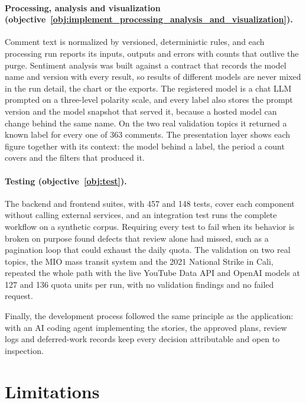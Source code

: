 \paragraph{Processing, analysis and visualization (objective~\ref{obj:implement_processing_analysis_and_visualization}).} Comment text is normalized by versioned, deterministic rules, and each processing run reports its inputs, outputs and errors with counts that outlive the purge. Sentiment analysis was built against a contract that records the model name and version with every result, so results of different models are never mixed in the run detail, the chart or the exports. The registered model is a chat LLM prompted on a three-level polarity scale, and every label also stores the prompt version and the model snapshot that served it, because a hosted model can change behind the same name. On the two real validation topics it returned a known label for every one of 363 comments.
The presentation layer shows each figure together with its context: the model behind a label, the period a count covers and the filters that produced it.

\paragraph{Testing (objective~\ref{obj:test}).} The backend and frontend suites, with 457 and 148 tests, cover each component without calling external services, and an integration test runs the complete workflow on a synthetic corpus. Requiring every test to fail when its behavior is broken on purpose found defects that review alone had missed, such as a pagination loop that could exhaust the daily quota. The validation on two real topics, the MIO mass transit system and the 2021 National Strike in Cali, repeated the whole path with the live YouTube Data API and OpenAI models at 127 and 136 quota units per run, with no validation findings and no failed request.

Finally, the development process followed the same principle as the application: with an AI coding agent implementing the stories, the approved plans, review logs and deferred-work records keep every decision attributable and open to inspection.

\section{Limitations}

